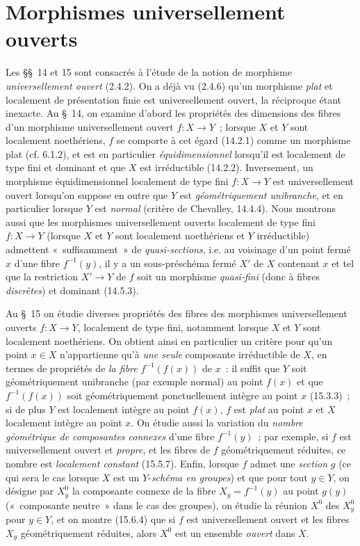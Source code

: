 \section{Morphismes universellement ouverts}
\label{section:IV.14-fr}

Les \S\S~14 et 15 sont consacrés à l'étude de la notion de morphisme
\emph{universellement ouvert} (2.4.2). On a déjà vu (2.4.6) qu'un morphisme
\emph{plat} et localement de présentation finie est universellement ouvert, la
réciproque étant inexacte. Au \S~14, on examine d'abord les propriétés des
dimensions des fibres d'un morphisme universellement ouvert $f:X\to Y$~;
lorsque $X$ et $Y$ sont localement noethériens, $f$ se comporte à cet égard
(14.2.1) comme un morphisme plat (cf. 6.1.2), et est en particulier
\emph{équidimensionnel} lorsqu'il est localement de type fini et dominant et que
$X$ est irréductible (14.2.2). Inversement, un morphisme équidimensionnel
localement de type fini $f:X\to Y$ est universellement ouvert lorsqu'on suppose
en outre que $Y$ est \emph{géométriquement unibranche}, et en particulier lorsque
$Y$ est \emph{normal} (critère de Chevalley, 14.4.4). Nous montrons aussi que les
morphismes universellement ouverts localement de type fini $f:X\to Y$ (lorsque
$X$ et $Y$ sont
localement noethériens et $Y$ irréductible) admettent «~suffisamment~» de
\emph{quasi-sections}, i.e. au voisinage d'un point fermé $x$ d'une fibre
$f^{-1}(y)$, il y a un sous-préschéma fermé $X'$ de $X$ contenant $x$ et tel que
la restriction $X'\to Y$ de $f$ soit un morphisme \emph{quasi-fini} (donc à fibres
\emph{discrètes}) et dominant (14.5.3).

Au \S~15 on étudie diverses propriétés des fibres des morphismes universellement
ouverts $f:X\to Y$, localement de type fini, notamment lorsque $X$ et $Y$ sont
localement noethériens. On obtient ainsi en particulier un critère pour qu'un
point $x\in X$ n'appartienne qu'à \emph{une seule} composante irréductible de $X$,
en termes de propriétés de \emph{la fibre} $f^{-1}(f(x))$ de $x$~: il suffit que
$Y$ soit géométriquement unibranche (par exemple normal) au point $f(x)$ et que
$f^{-1}(f(x))$ soit géométriquement ponctuellement intègre au point $x$ (15.3.3)~;
si de plus $Y$ est localement intègre au point $f(x)$, $f$ est \emph{plat} au point
$x$ et $X$ localement intègre au point $x$. On étudie aussi la variation du
\emph{nombre géométrique de composantes connexes} d'une fibre $f^{-1}(y)$~; par
exemple, si $f$ est universellement ouvert et \emph{propre}, et les fibres de $f$
géométriquement réduites, ce nombre est \emph{localement constant} (15.5.7).
Enfin, lorsque $f$ admet une \emph{section} $g$ (ce qui sera le cas lorsque $X$ est
un $Y$-\emph{schéma en groupes}) et que pour tout $y\in Y$, on désigne par $X_y^0$
la composante connexe de la fibre $X_y=f^{-1}(y)$ au point $g(y)$ («~composante
neutre~» dans le cas des groupes), on étudie la réunion $X^0$ des $X_y^0$ pour
$y\in Y$, et on montre (15.6.4) que si $f$ est universellement ouvert et les fibres
$X_y$ géométriquement réduites, alors $X^0$ est un ensemble \emph{ouvert} dans $X$.

